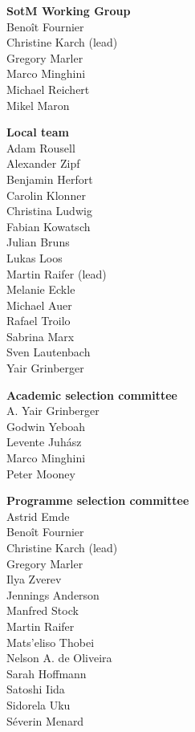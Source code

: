 \newlength{\volunteerSpace}
\setlength{}
\RaggedRight
\begin{multicols}{2}
  \begin{small}
    \textbf{SotM Working Group}\\
    Benoît Fournier\\
    Christine Karch (lead)\\
    Gregory Marler\\
    Marco Minghini\\
    Michael Reichert\\
    Mikel Maron

    \vspace{\volunteerSpace}
    \textbf{Local team}\\
    Adam Rousell\\
    Alexander Zipf\\
    Benjamin Herfort\\
    Carolin Klonner\\
    Christina Ludwig\\
    Fabian Kowatsch\\
    Julian Bruns\\
    Lukas Loos\\
    Martin Raifer (lead)\\
    Melanie Eckle\\
    Michael Auer\\
    Rafael Troilo\\
    Sabrina Marx\\
    Sven Lautenbach\\
    Yair Grinberger

    \enlargethispage{1\baselineskip}

    \vspace{\volunteerSpace}
    \textbf{Academic selection committee}\\
    A. Yair Grinberger\\
    Godwin Yeboah\\
    Levente Juhász\\
    Marco Minghini\\
    Peter Mooney

    \vspace{\volunteerSpace}
    \textbf{Programme selection \mbox{committee}}\\
    Astrid Emde\\
    Benoît Fournier\\
    Christine Karch (lead)\\
    Gregory Marler\\
    Ilya Zverev\\
    Jennings Anderson\\
    Manfred Stock\\
    Martin Raifer\\
    Mats'eliso Thobei\\
    Nelson A. de Oliveira\\
    Sarah Hoffmann\\
    Satoshi Iida\\
    Sidorela Uku\\
    Séverin Menard


\end{small}
\end{multicols}
